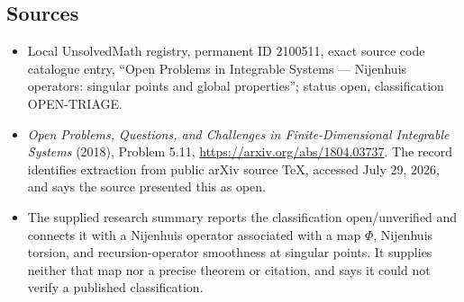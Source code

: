 \documentclass[11pt]{article}
\begin{document}
\subsection{Sources}
\begin{itemize}
\item Local UnsolvedMath registry, permanent ID 2100511, exact source code catalogue entry, ``Open Problems in Integrable Systems --- Nijenhuis operators: singular points and global properties''; status open, classification OPEN-TRIAGE.
\item \emph{Open Problems, Questions, and Challenges in Finite-Dimensional Integrable Systems} (2018), Problem 5.11, \url{https://arxiv.org/abs/1804.03737}. The record identifies extraction from public arXiv source TeX, accessed July 29, 2026, and says the source presented this as open.
\item The supplied research summary reports the classification open/unverified and connects it with a Nijenhuis operator associated with a map $\Phi$, Nijenhuis torsion, and recursion-operator smoothness at singular points. It supplies neither that map nor a precise theorem or citation, and says it could not verify a published classification.
\end{itemize}
\end{document}
